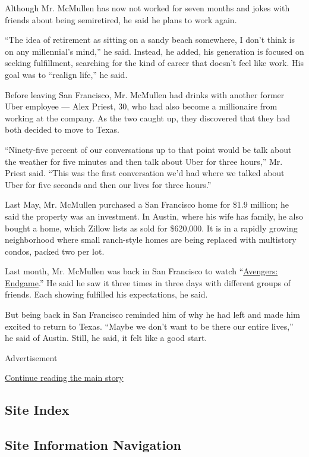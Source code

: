 Although Mr. McMullen has now not worked for seven months and jokes with
friends about being semiretired, he said he plans to work again.

``The idea of retirement as sitting on a sandy beach somewhere, I don't
think is on any millennial's mind,'' he said. Instead, he added, his
generation is focused on seeking fulfillment, searching for the kind of
career that doesn't feel like work. His goal was to ``realign life,'' he
said.

Before leaving San Francisco, Mr. McMullen had drinks with another
former Uber employee --- Alex Priest, 30, who had also become a
millionaire from working at the company. As the two caught up, they
discovered that they had both decided to move to Texas.

``Ninety-five percent of our conversations up to that point would be
talk about the weather for five minutes and then talk about Uber for
three hours,'' Mr. Priest said. ``This was the first conversation we'd
had where we talked about Uber for five seconds and then our lives for
three hours.''

Last May, Mr. McMullen purchased a San Francisco home for \$1.9 million;
he said the property was an investment. In Austin, where his wife has
family, he also bought a home, which Zillow lists as sold for \$620,000.
It is in a rapidly growing neighborhood where small ranch-style homes
are being replaced with multistory condos, packed two per lot.

Last month, Mr. McMullen was back in San Francisco to watch
``\href{https://www.nytimes3xbfgragh.onion/2019/04/23/movies/avengers-endgame-review.html}{Avengers:
Endgame}.'' He said he saw it three times in three days with different
groups of friends. Each showing fulfilled his expectations, he said.

But being back in San Francisco reminded him of why he had left and made
him excited to return to Texas. ``Maybe we don't want to be there our
entire lives,'' he said of Austin. Still, he said, it felt like a good
start.

Advertisement

\protect\hyperlink{after-bottom}{Continue reading the main story}

\hypertarget{site-index}{%
\subsection{Site Index}\label{site-index}}

\hypertarget{site-information-navigation}{%
\subsection{Site Information
Navigation}\label{site-information-navigation}}

